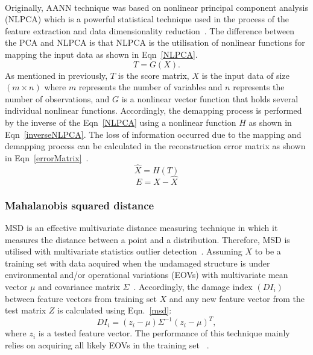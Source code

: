 \paragraph{}
Originally, AANN technique was based on nonlinear principal component analysis (NLPCA) which is a powerful statistical technique used in the process of the feature extraction and data dimensionality reduction~\cite{Dervilis2014}. 
The difference between the PCA and NLPCA is that NLPCA is the utilisation of nonlinear functions for mapping the input data as shown in Eqn~\ref{NLPCA}.
\begin{equation}
	T= G(X) .
	\label{NLPCA}
\end{equation} 
As mentioned in previously, $T$ is the score matrix, $X$ is the input data of size $(m \times n)$ where $m$ represents the number of variables and $n$ represents the number of observations, and $G$ is a nonlinear vector function that holds several individual nonlinear functions. 
Accordingly, the demapping process is performed by the inverse of the Eqn~\ref{NLPCA} using a nonlinear function $H$ as shown in Eqn~\ref{inverseNLPCA}.
The loss of information occurred due to the mapping and demapping process can be calculated in the reconstruction error matrix as shown in Eqn~\ref{errorMatrix}~\cite{Dervilis2014}.
\begin{equation}
	\hat{X} = H(T)
	\label{inverseNLPCA}
\end{equation}
\begin{equation}
	E= X-\hat{X}
	\label{errorMatrix}
\end{equation}
\subsubsection{Mahalanobis squared distance}
MSD is an effective multivariate distance measuring technique in which it measures the distance between a point and a distribution.
Therefore, MSD is utilised with multivariate statistics outlier detection~\cite{Worden2000}.
Assuming \(X\) to be a training set with data acquired when the undamaged structure is under environmental and/or operational variations (EOVs) with multivariate mean vector \(\mu\) and covariance matrix \(\Sigma\)~\cite{Farrar2013}.
Accordingly, the damage index \((DI_i)\) between feature vectors from training set \(X\) and any new feature vector from the test matrix \(Z\) is calculated using Eqn.~\ref{msd}:
\begin{equation}
	DI_i = (z_i-\mu)\Sigma^{-1}(z_i-\mu)^T,
	\label{msd}
\end{equation}
where \(z_i\) is a tested feature vector.
The performance of this technique mainly relies on acquiring all likely EOVs in the training set~
\cite{Farrar2013}.
